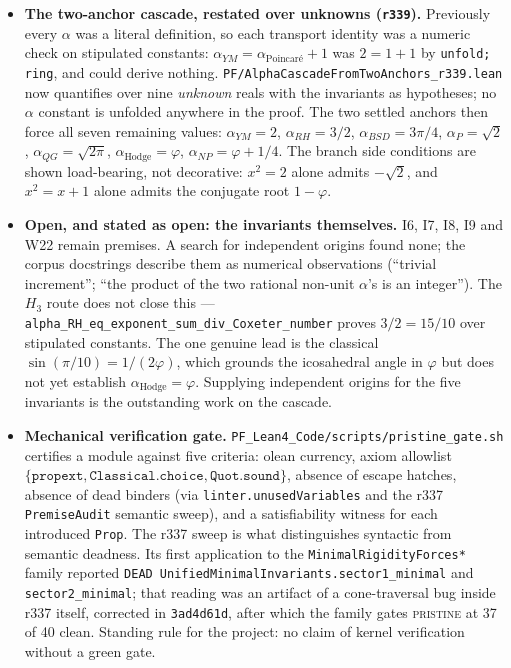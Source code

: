 \begin{itemize}
\item \textbf{The two-anchor cascade, restated over unknowns
(\texttt{r339}).} Previously every $\alpha$ was a literal definition, so
each transport identity was a numeric check on stipulated constants:
$\alpha_{YM} = \alpha_{\text{Poincar\'e}} + 1$ was $2 = 1 + 1$ by
\texttt{unfold; ring}, and could derive nothing.
\texttt{PF/AlphaCascadeFromTwoAnchors\_r339.lean} now quantifies over
nine \emph{unknown} reals with the invariants as hypotheses; no $\alpha$
constant is unfolded anywhere in the proof. The two settled anchors then
force all seven remaining values: $\alpha_{YM} = 2$,
$\alpha_{RH} = 3/2$, $\alpha_{BSD} = 3\pi/4$, $\alpha_{P} = \sqrt{2}$,
$\alpha_{QG} = \sqrt{2\pi}$, $\alpha_{\text{Hodge}} = \varphi$,
$\alpha_{NP} = \varphi + 1/4$. The branch side conditions are shown
load-bearing, not decorative: $x^{2} = 2$ alone admits $-\sqrt{2}$, and
$x^{2} = x + 1$ alone admits the conjugate root $1 - \varphi$.

\item \textbf{Open, and stated as open: the invariants themselves.} I6,
I7, I8, I9 and W22 remain premises. A search for independent origins
found none; the corpus docstrings describe them as numerical
observations (``trivial increment''; ``the product of the two rational
non-unit $\alpha$'s is an integer''). The $H_3$ route does not close
this --- \texttt{alpha\_RH\_eq\_exponent\_sum\_div\_Coxeter\_number}
proves $3/2 = 15/10$ over stipulated constants. The one genuine lead is
the classical $\sin(\pi/10) = 1/(2\varphi)$, which grounds the
icosahedral angle in $\varphi$ but does not yet establish
$\alpha_{\text{Hodge}} = \varphi$. Supplying independent origins for the
five invariants is the outstanding work on the cascade.

\item \textbf{Mechanical verification gate.}
\texttt{PF\_Lean4\_Code/scripts/pristine\_gate.sh} certifies a module
against five criteria: olean currency, axiom allowlist
$\{\texttt{propext}, \texttt{Classical.choice}, \texttt{Quot.sound}\}$,
absence of escape hatches, absence of dead binders (via
\texttt{linter.unusedVariables} and the r337 \texttt{PremiseAudit}
semantic sweep), and a satisfiability witness for each introduced
\texttt{Prop}. The r337 sweep is what distinguishes syntactic from
semantic deadness. Its first application to the
\texttt{MinimalRigidityForces*} family reported
\texttt{DEAD UnifiedMinimalInvariants.sector1\_minimal} and
\texttt{sector2\_minimal}; that reading was an artifact of a
cone-traversal bug inside r337 itself, corrected in \texttt{3ad4d61d},
after which the family gates \textsc{pristine} at 37 of 40 clean.
Standing rule for the project: no claim of kernel verification without a
green gate.


\end{itemize}
